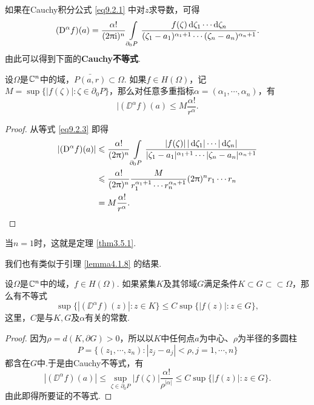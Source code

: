 如果在Cauchy积分公式 \eqref{eq9.2.1} 中对$z$求导数，可得
\begin{equation}\label{eq9.2.3}
  (\mathrm D^\alpha f)(a)=\frac{\alpha!}{(2\uppi\mathrm i)^n}
  \int\limits_{\partial_0P}
  \frac{f(\zeta)\mathop{}\!\mathrm{d} \zeta_1\cdots\mathop{}\!\mathrm{d} \zeta_n}{(\zeta_1-a_1)^{\alpha_1+1}\cdots(\zeta_n-a_n)^{\alpha_n+1}}.
\end{equation}
由此可以得到下面的\textbf{Cauchy不等式}.
\begin{theorem}\label{thm9.2.2}
  设$\Omega$是$\mathbb C^n$中的域，$\bar{P(a,r)}\subset\Omega$. 如果$f\in H(\Omega)$，记$M=\sup\{|f(\zeta)|:\zeta\in\partial_0P\}$，那么对任意多重指标$\alpha=(\alpha_1,\cdots,\alpha_n)$，有
  \[
    |(\DD^\alpha f)(a)\le M\frac{\alpha!}{r^\alpha}.
  \]
\end{theorem}
\begin{proof}
  从等式 \eqref{eq9.2.3} 即得
  \begin{align*}
    |(\mathrm D^\alpha f)(a)|&\leqslant\frac{\alpha!}{(2\uppi)^n}
    \int\limits_{\partial_0P}
    \frac{|f(\zeta)|\,|\mathop{}\!\mathrm{d} \zeta_1|\cdots|\mathop{}\!\mathrm{d} \zeta_n|}{|\zeta_1-a_1|^{\alpha_1+1}\cdots|\zeta_n-a_n|^{\alpha_n+1}}\\
    & \leqslant \frac{\alpha!}{(2\uppi)^n}\frac M{r_1^{\alpha_1+1}\cdots r_n^{\alpha_n+1}} (2\uppi)^nr_1\cdots r_n\\
    & = M\frac{\alpha!}{r^\alpha}. \qedhere
  \end{align*}
\end{proof}

当$n=1$时，这就是定理 \ref{thm3.5.1}.

我们也有类似于引理 \ref{lemma4.1.8} 的结果.
\begin{theorem}\label{thm9.2.3}
  设$\Omega$是$\mathbb C^n$中的域，$f\in H(\Omega)$. 如果紧集$K$及其邻域$G$满足条件$K\subset G\subset\subset \Omega$，那么有不等式
  \[
    \sup\{|(\DD^\alpha f)(z)|:z\in K\}\le C\sup\{|f(z)|:z\in G\},
  \]
  这里，$C$是与$K,G$及$\alpha$有关的常数.
\end{theorem}
\begin{proof}
  因为$\rho=d(K,\partial G)>0$，所以以$K$中任何点$a$为中心、$\rho$为半径的多圆柱
  \[
    P = \{(z_1,\cdots,z_n):|z_j-a_j|<\rho,j=1,\cdots,n\}
  \]
  都含在$G$中.于是由Cauchy不等式，有
  \[
    |(\DD^\alpha f)(a)|\le\sup_{\zeta\in\partial_0P}|f(\zeta)|\frac{\alpha!}{\rho^{|\alpha|}}
    \le C\sup\{|f(z)|:z\in G\}.
  \]
  由此即得所要证的不等式.
\end{proof}

